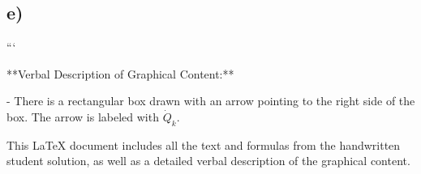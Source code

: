 

\subsection*{e)}

```

**Verbal Description of Graphical Content:**

- There is a rectangular box drawn with an arrow pointing to the right side of the box. The arrow is labeled with \(\dot{Q}_k\).

This LaTeX document includes all the text and formulas from the handwritten student solution, as well as a detailed verbal description of the graphical content.